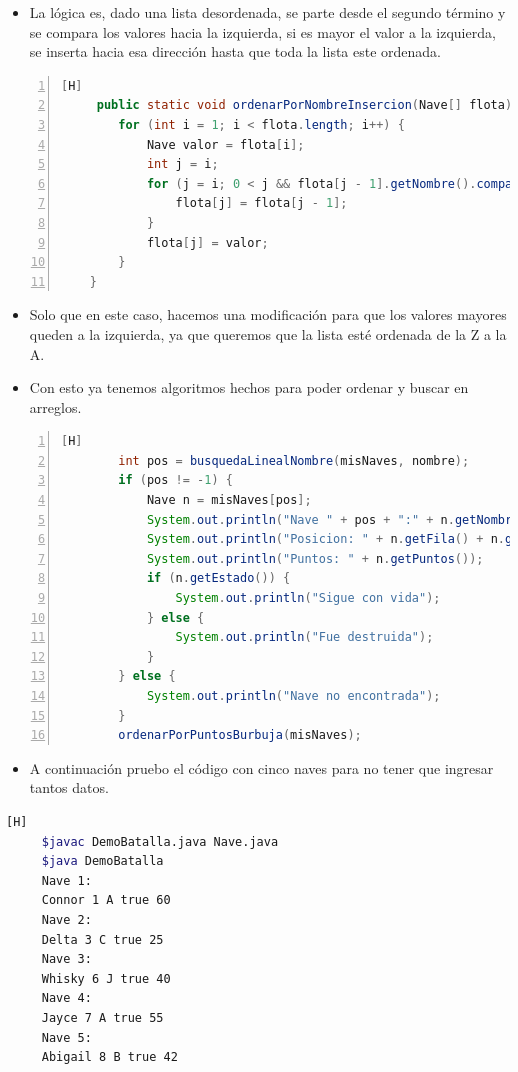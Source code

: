 \documentclass{article}
\begin{document}
	\begin{itemize}	
		\item La lógica es, dado una lista desordenada, se parte desde el segundo término y se compara los valores hacia la izquierda, si es mayor el valor a la izquierda, se inserta hacia esa dirección hasta que toda la lista este ordenada.
	\end{itemize}
	\begin{lstlisting}[language=java,caption={Ordenamiento por inserción: Cadenas de la Z a la A}, numbers=left][H]
	 public static void ordenarPorNombreInsercion(Nave[] flota) {
        for (int i = 1; i < flota.length; i++) {
            Nave valor = flota[i];
            int j = i;
            for (j = i; 0 < j && flota[j - 1].getNombre().compareTo(valor.getNombre()) < 0; j--) {
                flota[j] = flota[j - 1];
            }
            flota[j] = valor;
        }
    }
	\end{lstlisting}
	\begin{itemize}	
		\item Solo que en este caso, hacemos una modificación para que los valores mayores queden a la izquierda, ya que queremos que la lista esté ordenada de la Z a la A.
		\item Con esto ya tenemos algoritmos hechos para poder ordenar y buscar en arreglos.
	\end{itemize}
	\begin{lstlisting}[language=java,caption={Aplicando los métodos de búsqueda}, numbers=left][H]
	 	int pos = busquedaLinealNombre(misNaves, nombre);
        if (pos != -1) {
            Nave n = misNaves[pos];
            System.out.println("Nave " + pos + ":" + n.getNombre());
            System.out.println("Posicion: " + n.getFila() + n.getColumna());
            System.out.println("Puntos: " + n.getPuntos());
            if (n.getEstado()) {
                System.out.println("Sigue con vida");
            } else {
                System.out.println("Fue destruida");
            }
        } else {
            System.out.println("Nave no encontrada");
        }
        ordenarPorPuntosBurbuja(misNaves);
	\end{lstlisting}
	\begin{itemize}	
		\item A continuación pruebo el código con cinco naves para no tener que ingresar tantos datos.
	\end{itemize}
	\begin{lstlisting}[language=bash,caption={Prueba del código}][H]
	 $javac DemoBatalla.java Nave.java
	 $java DemoBatalla
	 Nave 1:
	 Connor 1 A true 60
	 Nave 2:
	 Delta 3 C true 25
	 Nave 3:
	 Whisky 6 J true 40
	 Nave 4:
	 Jayce 7 A true 55
	 Nave 5:
	 Abigail 8 B true 42
	\end{lstlisting}
	
\end{document}
